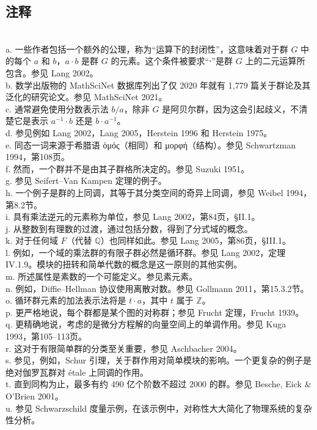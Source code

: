 \subsection{注释}\\  
a. 一些作者包括一个额外的公理，称为“运算下的封闭性”，这意味着对于群 \(G\) 中的每个 \(a\) 和 \(b\)，\(a \cdot b\) 是群 \(G\) 的元素。这个条件被要求“⋅”是群 \(G\) 上的二元运算所包含。参见 Lang 2002。\\   
b. 数学出版物的 MathSciNet 数据库列出了仅 2020 年就有 1,779 篇关于群论及其泛化的研究论文。参见 MathSciNet 2021。\\   
c. 通常避免使用分数表示法 \(b/a\)，除非 \(G\) 是阿贝尔群，因为这会引起歧义，不清楚它是表示 \(a^{-1} \cdot b\) 还是 \(b \cdot a^{-1}\)。\\   
d. 参见例如 Lang 2002，Lang 2005，Herstein 1996 和 Herstein 1975。\\   
e. 同态一词来源于希腊语 ὁμός（相同）和 μορφή（结构）。参见 Schwartzman 1994，第108页。\\   
f. 然而，一个群并不是由其子群格所决定的。参见 Suzuki 1951。\\   
g. 参见 Seifert–Van Kampen 定理的例子。\\   
h. 一个例子是群的上同调，其等于其分类空间的奇异上同调，参见 Weibel 1994，第8.2节。\\   
i. 具有乘法逆元的元素称为单位，参见 Lang 2002，第84页，§II.1。\\   
j. 从整数到有理数的过渡，通过包括分数，得到了分式域的概念。\\   
k. 对于任何域 \(F\)（代替 \(\mathbb{Q}\)）也同样如此。参见 Lang 2005，第86页，§III.1。\\   
l. 例如，一个域的乘法群的有限子群必然是循环群。参见 Lang 2002，定理 IV.1.9。模块的扭转和简单代数的概念是这一原则的其他实例。\\   
m. 所述属性是素数的一个可能定义。参见素元素。\\   
n. 例如，Diffie–Hellman 协议使用离散对数。参见 Gollmann 2011，第15.3.2节。\\   
o. 循环群元素的加法表示法将是 \(t \cdot a\)，其中 \(t\) 属于 \(\mathbb{Z}\)。\\   
p. 更严格地说，每个群都是某个图的对称群；参见 Frucht 定理，Frucht 1939。\\   
q. 更精确地说，考虑的是微分方程解的向量空间上的单调作用。参见 Kuga 1993，第105–113页。\\   
r. 这对于有限简单群的分类至关重要，参见 Aschbacher 2004。\\   
s. 参见，例如，Schur 引理，关于群作用对简单模块的影响。一个更复杂的例子是绝对伽罗瓦群对 étale 上同调的作用。\\   
t. 直到同构为止，最多有约 490 亿个阶数不超过 2000 的群。参见 Besche, Eick & O'Brien 2001。\\   
u. 参见 Schwarzschild 度量示例，在该示例中，对称性大大简化了物理系统的复杂性分析。
